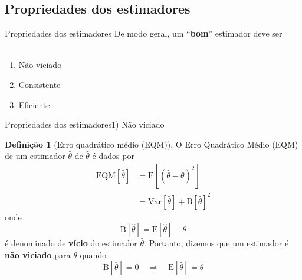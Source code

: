 \documentclass[10pt]{beamer}\usepackage[]{graphicx}\usepackage[]{color}
\newcommand{\mb}[1]{\mathbf{#1}}
\providecommand{\E}{\text{E}}
\providecommand{\Var}{\text{Var}}
\theoremstyle{definition}
\newtheorem*{mydef}{Definição}
\begin{document}
\subsection[Propriedades]{Propriedades dos estimadores}

\begin{frame}[fragile]{Propriedades dos estimadores}
  De modo geral, um ``\textbf{bom}'' estimador deve ser \\~\\
  \begin{enumerate}
  \item Não viciado
  \item Consistente
  \item Eficiente
  \end{enumerate}
\end{frame}


\begin{frame}[fragile]{Propriedades dos estimadores}{1) Não viciado}
  \begin{mydef}[Erro quadrático médio (EQM)]
    O Erro Quadrático Médio (EQM) de um estimador $\hat{\theta}$ de
    $\hat{\theta}$ é dados por
    \begin{align*}
      \text{EQM}[\hat{\theta}] &= \E[(\hat{\theta} - \theta)^2] \\
                             &= \Var[\hat{\theta}] + \text{B}[\hat{\theta}]^2
    \end{align*}
    onde
    \begin{equation*}
      \text{B}[\hat{\theta}] = \E[\hat\theta] - \theta
    \end{equation*}
    é denominado de \textbf{vício} do estimador $\hat\theta$. Portanto,
    dizemos que um estimador é \textbf{não viciado} para $\theta$ quando
    \begin{equation*}
      \text{B}[\hat{\theta}] = 0 \quad \Rightarrow \quad \E[\hat{\theta}] = \theta
    \end{equation*}
  \end{mydef}
\end{frame}
\end{document}
